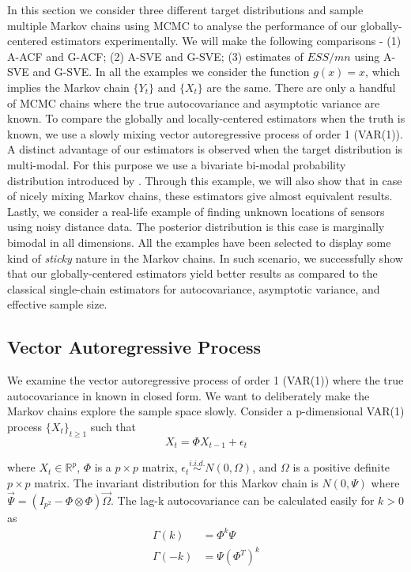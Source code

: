 \documentclass[11pt]{article}
\theoremstyle{remark}
\begin{document}
In this section we consider three different target distributions and sample multiple Markov chains using MCMC to analyse the performance of our globally-centered estimators experimentally. We will make the following comparisons - (1) A-ACF and G-ACF; (2) A-SVE and G-SVE; (3) estimates of $ESS/mn$ using A-SVE and G-SVE. In all the examples we consider the function $g(x) = x$, which implies the Markov chain $\{Y_t\}$ and $\{X_t\}$ are the same. There are only a handful of MCMC chains where the true autocovariance and asymptotic variance are known. To compare the globally and locally-centered estimators when the truth is known, we use a slowly mixing vector autoregressive process of order 1 (VAR(1)). A distinct advantage of our estimators is observed when the target distribution is multi-modal. For this purpose we use a bivariate bi-modal probability distribution introduced by \cite{gelman1991note}. Through this example, we will also show that in case of nicely mixing Markov chains, these estimators give almost equivalent results. Lastly, we consider a real-life example of finding unknown locations of sensors using noisy distance data. The posterior distribution is this case is marginally bimodal in all dimensions. All the examples have been selected to display some kind of \textit{sticky} nature in the Markov chains. In such scenario, we successfully show that our globally-centered estimators yield better results as compared to the classical single-chain estimators for autocovariance, asymptotic variance, and effective sample size.


\subsection{Vector Autoregressive Process} \label{ex:var}

We examine the vector autoregressive process of order 1 (VAR(1)) where the true autocovariance in known in closed form. We want to deliberately make the Markov chains explore the sample space slowly. Consider a p-dimensional VAR(1) process $\{X_t\}_{t \geq 1}$ such that
%
\[
X_t = \Phi X_{t-1} + \epsilon_t
\]

where $X_t \in \mathbb{R}^p$, $\Phi $ is a $p \times p $ matrix, $ \epsilon_t \overset{i.i.d.}{\sim} N(0, \Omega)$, and $\Omega$ is a positive definite $p \times p$ matrix. The invariant distribution for this Markov chain is $N(0, \Psi)$ where $\Vec{\Psi} = (I_{p^2} - \Phi \otimes \Phi)\Vec{\Omega}$. The lag-k autocovariance can be calculated easily for $k >0$ as
%
\begin{align*}
    \Gamma(k) &= \Phi^k\Psi\\
    \Gamma(-k) &= \Psi(\Phi^T)^k
\end{align*}
\end{document}
